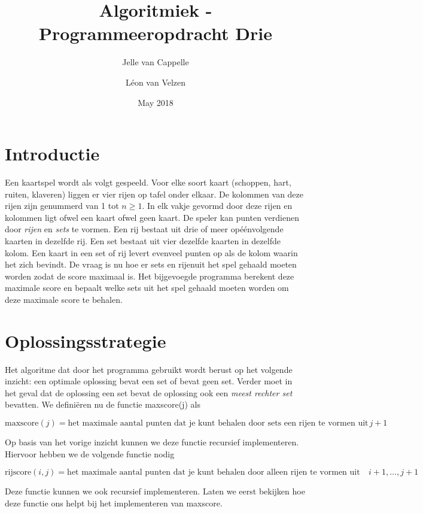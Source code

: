 \documentclass{article}
\title{Algoritmiek - Programmeeropdracht Drie}
\author{Jelle van Cappelle \and L\'eon van Velzen}
\date{May 2018}
\begin{document}
\maketitle

\section{Introductie}

Een kaartspel wordt als volgt gespeeld. Voor elke soort kaart (schoppen, hart, ruiten, klaveren) liggen er vier rijen op tafel onder elkaar. De kolommen van deze rijen zijn genummerd van 1 tot $n \ge 1$. In elk vakje gevormd door deze rijen en kolommen ligt ofwel een kaart ofwel geen kaart. De speler kan punten verdienen door \emph{rijen} en \emph{sets} te vormen. Een rij bestaat uit drie of meer op\'e\'envolgende kaarten in dezelfde rij. Een set bestaat uit vier dezelfde kaarten in dezelfde kolom. Een kaart in een set of rij levert evenveel punten op als de kolom waarin het zich bevindt. De vraag is nu hoe er sets en rijenuit het spel gehaald moeten worden zodat de score maximaal is. Het bijgevoegde programma berekent deze maximale score en bepaalt welke sets uit het spel gehaald moeten worden om deze maximale score te behalen.

\section{Oplossingsstrategie}

Het algoritme dat door het programma gebruikt wordt berust op het volgende inzicht: een optimale oplossing bevat een set of bevat geen set. Verder moet in het geval dat de oplossing een set bevat de oplossing ook een \emph{meest rechter set} bevatten. We defini\"eren nu de functie maxscore(j) als

$$
\text{maxscore}(j) = \text{het maximale aantal punten dat je kunt behalen door sets een rijen te vormen uit de aanwezige speelkaarten met waardes 1, ... } j + 1
$$

Op basis van het vorige inzicht kunnen we deze functie recursief implementeren. Hiervoor hebben we de volgende functie nodig

$$
\text{rijscore}(i,j) = \text{het maximale aantal punten dat je kunt behalen door alleen rijen te vormen uit de aanwezige speelkaarten in kolommen} i + 1, \ldots, j+1
$$

Deze functie kunnen we ook recursief implementeren. Laten we eerst bekijken hoe deze functie ons helpt bij het implementeren van maxscore.
\end{document}
